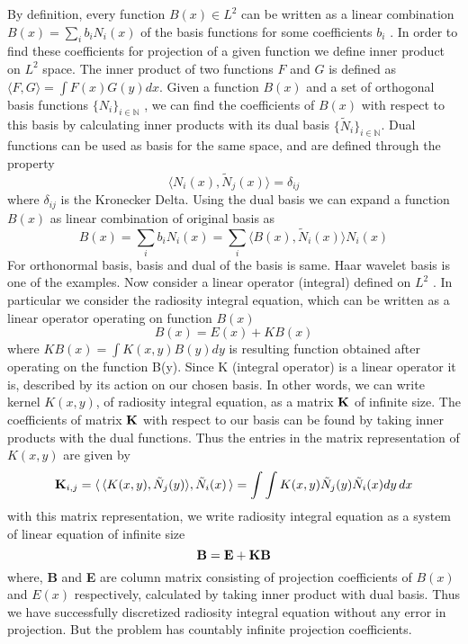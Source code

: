 By definition, every function $B(x) \in L^2$ can be written as a linear combination  $B(x) = \sum _i b_i N_i(x)$ of the basis functions for
some coefficients $b_i$ . In order to find these coefficients for projection of a given
function we define inner product on $L^2$ space. The inner product of
two functions $F$ and $G$ is defined as $\langle F, G \rangle  = \int F(x) G(y) dx$.
Given a function $B(x)$ and a set of orthogonal basis functions $\{N_i \}_{i \in \mathbb{N}}$ , we can find the coefficients of $B(x)$ with respect to this basis by
calculating inner products with its dual basis $\{\tilde{N}_i \}_{i \in \mathbb{N}}$. Dual functions can be used as basis for the same space, and are defined
through the property
\begin{equation}
\langle N_i(x),\tilde{N}_j(x) \rangle =\delta_{ij}
\end{equation}
where $\delta_{ij}$ is the Kronecker Delta. Using the dual basis we can expand a function  $B(x)$ as linear combination of original basis as
\begin{equation}\label{eq:radproj}
B(x) = \sum_ib_iN_i(x)= \sum_i\langle B(x),\tilde{N}_i(x) \rangle N_i(x)
\end{equation}
For orthonormal basis, basis and dual of the basis is same. Haar wavelet basis is one of the examples. 
Now consider a linear operator (integral) defined on $L^2$ . In particular we consider the radiosity
integral equation, which can be written as a linear operator operating on function $B(x)$\\
\begin{equation}
B(x)=E(x)+KB(x)
\end{equation}
where $KB(x) = \int K(x, y)B(y)dy$ is resulting function obtained after operating on the function B(y). Since K (integral operator) is a linear operator it
is, described by its action on our chosen basis. In other words, we
can write kernel $K(x,y)$, of radiosity integral equation, as a matrix $\bf{K}$ of infinite size. The coefficients of matrix $\bf{K}$  with
respect to our basis can be found by taking inner products with the dual functions. Thus the entries in the matrix representation
of $K(x,y)$ are given by\\
\begin{equation}\label{eq:kijcalc}
{\bf K}_{i,j}=\langle\, \langle K(x,y),\tilde{N}_j(y)\rangle,\tilde{N}_i(x) \,\rangle =\int \int K(x,y)\tilde{N}_j(y)\tilde{N}_i(x) dy\,dx
\end{equation}
with this matrix representation, we write radiosity integral equation as a system of linear equation of infinite size\\
\begin{equation}\label{eq:systemeq}
\bf{B=E+KB}
\end{equation}
where, {\bf B} and {\bf E} are column matrix consisting of projection coefficients of $B(x)$ and $E(x)$ respectively, calculated by taking inner product with dual basis. Thus we have successfully discretized radiosity integral equation without any error in projection. But the problem has countably infinite projection coefficients.

